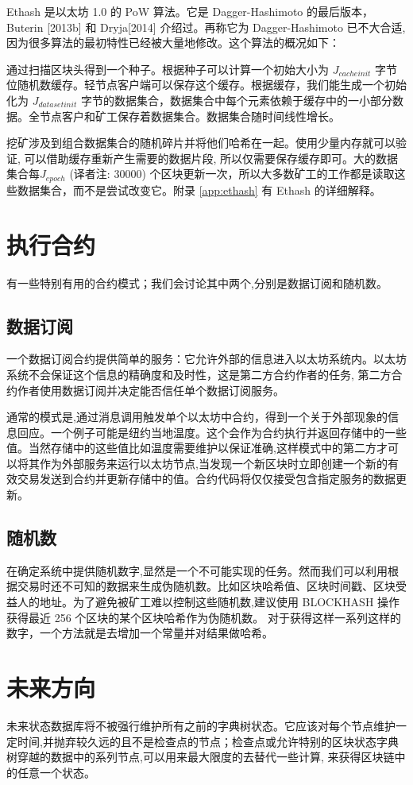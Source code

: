 \documentclass[9pt,oneside]{amsart}
\begin{document}
\begin{multicols}{2}
Ethash 是以太坊 1.0 的 PoW 算法。它是 Dagger-Hashimoto 的最后版本，Buterin
 [2013b] 和 Dryja[2014] 介绍过。再称它为 Dagger-Hashimoto 已不大合适, 因为很多算法的最初特性已经被大量地修改。这个算法的概况如下：

通过扫描区块头得到一个种子。根据种子可以计算一个初始大小为 $J_{cacheinit}$ 字节位随机数缓存。轻节点客户端可以保存这个缓存。根据缓存，我们能生成一个初始化为 $J_{datasetinit}$ 字节的数据集合，数据集合中每个元素依赖于缓存中的一小部分数据。全节点客户和矿工保存着数据集合。数据集合随时间线性增长。

挖矿涉及到组合数据集合的随机碎片并将他们哈希在一起。使用少量内存就可以验证, 可以借助缓存重新产生需要的数据片段, 所以仅需要保存缓存即可。大的数据集合每$J_{epoch}$ (译者注: 30000) 个区块更新一次，所以大多数矿工的工作都是读取这些数据集合，而不是尝试改变它。附录 \ref{app:ethash} 有 Ethash 的详细解释。

\section{执行合约}
有一些特别有用的合约模式；我们会讨论其中两个,分别是数据订阅和随机数。

\subsection{数据订阅}
一个数据订阅合约提供简单的服务：它允许外部的信息进入以太坊系统内。以太坊系统不会保证这个信息的精确度和及时性，这是第二方合约作者的任务, 第二方合约作者使用数据订阅并决定能否信任单个数据订阅服务。

通常的模式是,通过消息调用触发单个以太坊中合约，得到一个关于外部现象的信息回应。一个例子可能是纽约当地温度。这个会作为合约执行并返回存储中的一些值。当然存储中的这些值比如温度需要维护以保证准确,这样模式中的第二方才可以将其作为外部服务来运行以太坊节点,当发现一个新区块时立即创建一个新的有效交易发送到合约并更新存储中的值。合约代码将仅仅接受包含指定服务的数据更新。

\subsection{随机数}
在确定系统中提供随机数字,显然是一个不可能实现的任务。然而我们可以利用根据交易时还不可知的数据来生成伪随机数。比如区块哈希值、区块时间戳、区块受益人的地址。为了避免被矿工难以控制这些随机数,建议使用 {\small BLOCKHASH} 操作获得最近 256 个区块的某个区块哈希作为伪随机数。 对于获得这样一系列这样的数字，一个方法就是去增加一个常量并对结果做哈希。

\section{未来方向} \label{ch:future}
未来状态数据库将不被强行维护所有之前的字典树状态。它应该对每个节点维护一定时间,并抛弃较久远的且不是检查点的节点；检查点或允许特别的区块状态字典树穿越的数据中的系列节点,可以用来最大限度的去替代一些计算, 来获得区块链中的任意一个状态。


\end{multicols}
\end{document}
